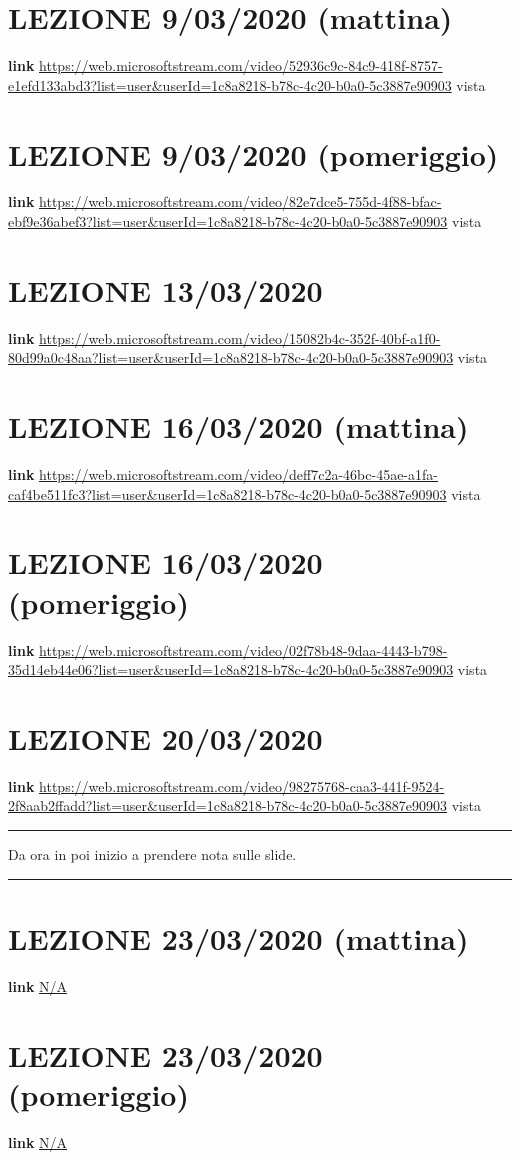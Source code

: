\documentclass[a4paper, 9pt]{article}
\begin{document}
\maketitle

\section{LEZIONE 9/03/2020 (mattina)}
\textbf{link} \url{https://web.microsoftstream.com/video/52936c9c-84c9-418f-8757-e1efd133abd3?list=user&userId=1c8a8218-b78c-4c20-b0a0-5c3887e90903} vista
\section{LEZIONE 9/03/2020 (pomeriggio)}
\textbf{link} \url{https://web.microsoftstream.com/video/82e7dce5-755d-4f88-bfac-ebf9e36abef3?list=user&userId=1c8a8218-b78c-4c20-b0a0-5c3887e90903} vista
\section{LEZIONE 13/03/2020}
\textbf{link} \url{https://web.microsoftstream.com/video/15082b4c-352f-40bf-a1f0-80d99a0c48aa?list=user&userId=1c8a8218-b78c-4c20-b0a0-5c3887e90903} vista
\section{LEZIONE 16/03/2020 (mattina)}
\textbf{link} \url{https://web.microsoftstream.com/video/deff7c2a-46bc-45ae-a1fa-caf4be511fc3?list=user&userId=1c8a8218-b78c-4c20-b0a0-5c3887e90903} vista
\section{LEZIONE 16/03/2020 (pomeriggio)}
\textbf{link} \url{https://web.microsoftstream.com/video/02f78b48-9daa-4443-b798-35d14eb44e06?list=user&userId=1c8a8218-b78c-4c20-b0a0-5c3887e90903} vista
\section{LEZIONE 20/03/2020}
\textbf{link} \url{https://web.microsoftstream.com/video/98275768-caa3-441f-9524-2f8aab2ffadd?list=user&userId=1c8a8218-b78c-4c20-b0a0-5c3887e90903} vista
\newline
\rule{\textwidth}{0,4pt}
Da ora in poi inizio a prendere nota sulle slide.\newline
\rule{\textwidth}{0,4pt}
\section{LEZIONE 23/03/2020 (mattina)}
\textbf{link} \url{N/A} 
\section{LEZIONE 23/03/2020 (pomeriggio)}
\textbf{link} \url{N/A} 
\end{document}
